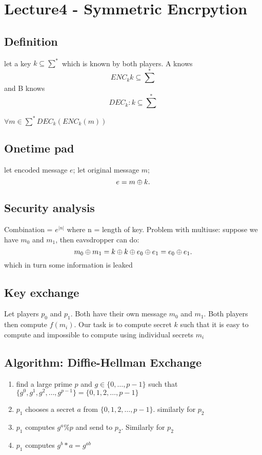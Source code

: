 \documentclass[../main.tex]{subfile}
\begin{document}
\section{Lecture4 - Symmetric Encrpytion}
\subsection{Definition}

let a key $k \subseteq \sum^*$ which is known by both players. A knows \[
ENC_{k} k \subseteq \sum^*\] and B knows \[
DEC_{k}: k \subseteq \sum^*
\] 

$\forall m \in \sum^* DEC_{k}(ENC_{k}(m))$

\subsection{Onetime pad}
let encoded message $e$;
let original message $m$;
\[
e = m \oplus k
.\] 

\subsection{Security analysis}
Combination = $e^{|n|}$ where n = length of key.
Problem with multiuse: suppose we have $m_{0}$ and $m_{1}$, then eavsdropper can do: \[
m_{0} \oplus m_{1} = k \oplus k \oplus e_{0} \oplus e_{1} 
= e_{0} \oplus e_{1}
.\] which in turn some information is leaked \implies {}

\subsection{Key exchange}
Let players $p_{0}$ and $p_{1}$. Both have their own message $m_{0}$ and $m_{1}$. Both players then compute $f(m_{i})$. Our task is to compute secret $k$ such that it is easy to compute and impossible to compute using individual secrets $m_{i}$

\subsection{Algorithm: Diffie-Hellman Exchange}
\begin{enumerate}
	\item find a large prime $p$ and $g\in \bigl\{ 0,\ldots, p-1 \bigl\}$ such that $\bigl\{ g^0, g^1, g^2, \ldots, g^{p-1} \bigl\} = \bigl\{ 0, 1, 2 , \ldots, p-1 \bigl\}$
\item	$p_{1}$ chooses a secret $a$ from $\bigl\{ 0,1,2,\ldots,p-1 \bigl\}$. similarly for $p_{2}$
\item $p_{1}$ computes $g^{a} \% p$ and send to $p_{2}$. Similarly for $p_{2}$
\item $p_{1}$ computes $g^{b} *a = g^{ab}$
\end{enumerate}
\end{document}
